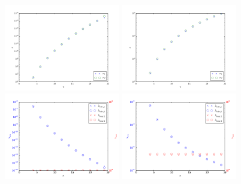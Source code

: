 \documentclass{marine_2015}
\begin{document}
 \begin{figure}[ht]
 \centering
 \includegraphics[width=0.45\textwidth]{img/shen_cond}
 \includegraphics[width=0.45\textwidth]{img/sine_cond}\\
 \includegraphics[width=0.45\textwidth]{img/shen_spectrum}
 \includegraphics[width=0.45\textwidth]{img/sine_spectrum}\\
 \caption{}
 \label{fig:no_precon}
 \end{figure}
 
\end{document}
